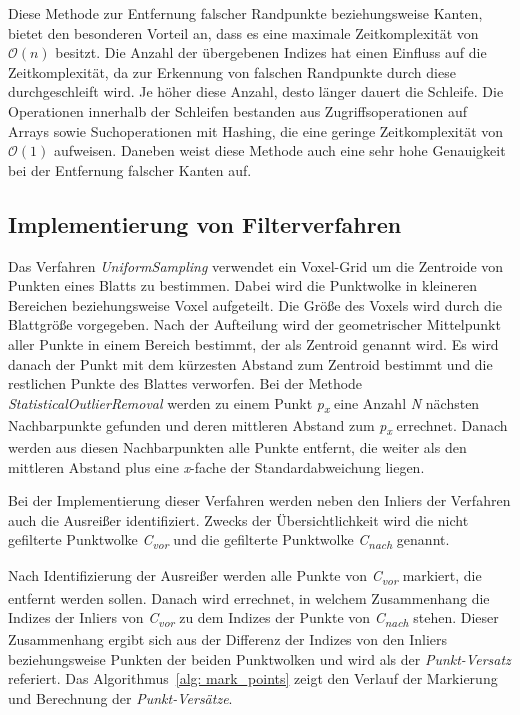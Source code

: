 Diese Methode zur Entfernung falscher Randpunkte beziehungsweise Kanten, bietet den besonderen Vorteil an, dass es eine maximale Zeitkomplexität von $\mathcal{O}(n)$ besitzt. Die Anzahl der übergebenen Indizes hat einen Einfluss auf die Zeitkomplexität, da zur Erkennung von falschen Randpunkte durch diese durchgeschleift wird. Je höher diese Anzahl, desto länger dauert die Schleife. Die Operationen innerhalb der Schleifen bestanden aus Zugriffsoperationen auf Arrays sowie Suchoperationen mit Hashing, die eine geringe Zeitkomplexität von $\mathcal{O}(1)$ aufweisen. Daneben weist diese Methode auch eine sehr hohe Genauigkeit bei der Entfernung falscher Kanten auf.

\subsection{Implementierung von Filterverfahren} \label{filter_verfahren}
Das Verfahren \textit{UniformSampling} verwendet ein Voxel-Grid um die Zentroide von Punkten eines Blatts zu bestimmen. Dabei wird die Punktwolke in kleineren Bereichen beziehungsweise Voxel aufgeteilt. Die Größe des Voxels wird durch die Blattgröße vorgegeben. Nach der Aufteilung wird der geometrischer Mittelpunkt aller Punkte in einem Bereich bestimmt, der als Zentroid genannt wird. Es wird danach der Punkt mit dem kürzesten Abstand zum Zentroid bestimmt und die restlichen Punkte des Blattes verworfen. Bei der Methode \textit{StatisticalOutlierRemoval} werden zu einem Punkt \textit{p\textsubscript{x}} eine Anzahl \textit{N} nächsten Nachbarpunkte gefunden und deren mittleren Abstand zum \textit{p\textsubscript{x}} errechnet. Danach werden aus diesen Nachbarpunkten alle Punkte entfernt, die weiter als den mittleren Abstand plus eine \textit{x}-fache der Standardabweichung liegen. \autocite{rusu_3d_2011}

Bei der Implementierung dieser Verfahren werden neben den Inliers der Verfahren auch die Ausreißer identifiziert. Zwecks der Übersichtlichkeit wird die nicht gefilterte Punktwolke \textit{C\textsubscript{vor}} und die gefilterte Punktwolke \textit{C\textsubscript{nach}} genannt. 

Nach Identifizierung der Ausreißer werden alle Punkte von \textit{C\textsubscript{vor}} markiert, die entfernt werden sollen. Danach wird errechnet, in welchem Zusammenhang die Indizes der Inliers von \textit{C\textsubscript{vor}} zu dem Indizes der Punkte von \textit{C\textsubscript{nach}} stehen. Dieser Zusammenhang ergibt sich aus der Differenz der Indizes von den Inliers beziehungsweise Punkten der beiden Punktwolken und wird als der \textit{Punkt-Versatz} referiert. Das Algorithmus~\ref{alg: mark_points} zeigt den Verlauf der Markierung und Berechnung der \textit{Punkt-Versätze}. 

